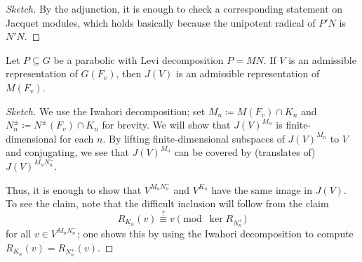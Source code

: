 \documentclass{article}
\begin{document}
\begin{proof}[Sketch]
	By the adjunction, it is enough to check a corresponding statement on Jacquet modules, which holds basically because the unipotent radical of $P'N$ is $N'N$.
\end{proof}
\begin{proposition}
	Let $P\subseteq G$ be a parabolic with Levi decomposition $P=MN$. If $V$ is an admissible representation of $G(F_v)$, then $J(V)$ is an admissible representation of $M(F_v)$.
\end{proposition}
\begin{proof}[Sketch]
	We use the Iwahori decomposition; set $M_n\coloneqq M(F_v)\cap K_n$ and $N_n^\pm\coloneqq N^\pm(F_v)\cap K_n$ for brevity. We will show that $J(V)^{M_n}$ is finite-dimensional for each $n$. By lifting finite-dimensional subspaces of $J(V)^{M_n}$ to $V$ and conjugating, we see that $J(V)^{M_n}$ can be covered by (translates of) $J(V)^{M_nN_n^-}$.

	Thus, it is enough to show that $V^{M_nN_n^-}$ and $V^{K_n}$ have the same image in $J(V)$. To see the claim, note that the difficult inclusion will follow from the claim
	\[R_{K_n}(v)\stackrel?\equiv v\pmod{\ker R_{N_n^+}}\]
	for all $v\in V^{M_nN_n^-}$; one shows this by using the Iwahori decomposition to compute $R_{K_n}(v)=R_{N_n^+}(v)$.
\end{proof}
\end{document}
